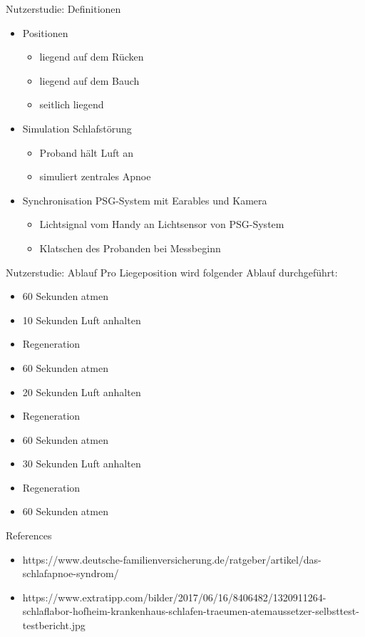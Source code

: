 \documentclass[18pt]{beamer}
\begin{document}
\begin{frame}{Nutzerstudie: Definitionen}
	\begin{itemize}
		\item Positionen
		\begin{itemize}
			\item liegend auf dem Rücken
			\item liegend auf dem Bauch
			\item seitlich liegend
		\end{itemize}
		\item Simulation Schlafstörung
		\begin{itemize}
			\item Proband hält Luft an
			\item simuliert zentrales Apnoe
		\end{itemize}
		\item Synchronisation PSG-System mit Earables und Kamera
		\begin{itemize}
			\item Lichtsignal vom Handy an Lichtsensor von PSG-System
			\item Klatschen des Probanden bei Messbeginn
		\end{itemize}
	\end{itemize}
	\end{frame}
	
\begin{frame}{Nutzerstudie: Ablauf}
Pro Liegeposition wird folgender Ablauf durchgeführt:
\begin{itemize}
	\item 60 Sekunden atmen
	\item 10 Sekunden Luft anhalten
	\item Regeneration
	\item 60 Sekunden atmen
	\item 20 Sekunden Luft anhalten
	\item Regeneration
	\item 60 Sekunden atmen
	\item 30 Sekunden Luft anhalten
	\item Regeneration
	\item 60 Sekunden atmen
\end{itemize}
\end{frame}


\appendix
\beginbackup

\begin{frame}[allowframebreaks]{References}
\begin{itemize}
	\item https://www.deutsche-familienversicherung.de/ratgeber/artikel/das-schlafapnoe-syndrom/
	\item https://www.extratipp.com/bilder/2017/06/16/8406482/1320911264-schlaflabor-hofheim-krankenhaus-schlafen-traeumen-atemaussetzer-selbsttest-testbericht.jpg
\end{itemize}
\printbibliography
\end{frame}

\backupend
\end{document}
